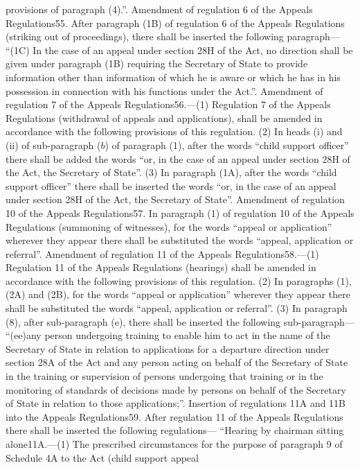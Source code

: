 \documentclass[a4paper]{article}
\begin{document}
provisions of paragraph (4).”.
Amendment of regulation 6 of the Appeals Regulations55. After paragraph (1B) of
regulation 6 of the Appeals Regulations (striking out of proceedings), there
shall be inserted the following paragraph—
“(1C) In the case of an appeal under section 28H of the Act, no direction shall
be given under paragraph (1B) requiring the Secretary of State to provide
information other than information of which he is aware or which he has in his
possession in connection with his functions under the Act.”.
Amendment of regulation 7 of the Appeals Regulations56.—(1) Regulation 7 of the
Appeals Regulations (withdrawal of appeals and applications), shall be amended
in accordance with the following provisions of this regulation.
(2) In heads (i) and (ii) of sub-paragraph ($b$) of paragraph (1), after the words
“child support officer” there shall be added the words “or, in the case of an
appeal under section 28H of the Act, the Secretary of State”.
(3) In paragraph (1A), after the words “child support officer” there shall be
inserted the words “or, in the case of an appeal under section 28H of the Act,
the Secretary of State”.
Amendment of regulation 10 of the Appeals Regulations57. In paragraph (1) of
regulation 10 of the Appeals Regulations (summoning of witnesses), for the words
“appeal or application” wherever they appear there shall be substituted the
words “appeal, application or referral”.
Amendment of regulation 11 of the Appeals Regulations58.—(1) Regulation 11 of
the Appeals Regulations (hearings) shall be amended in accordance with the
following provisions of this regulation.
(2) In paragraphs (1), (2A) and (2B), for the words “appeal or application”
wherever they appear there shall be substituted the words “appeal, application
or referral”.
(3) In paragraph (8), after sub-paragraph (e), there shall be inserted the
following sub-paragraph—
“(ee)any person undergoing training to enable him to act in the name of the
Secretary of State in relation to applications for a departure direction under
section 28A of the Act and any person acting on behalf of the Secretary of State
in the training or supervision of persons undergoing that training or in the
monitoring of standards of decisions made by persons on behalf of the Secretary
of State in relation to those applications;”.
Insertion of regulations 11A and 11B into the Appeals Regulations59. After
regulation 11 of the Appeals Regulations there shall be inserted the following
regulations—
“Hearing by chairman sitting alone11A.—(1) The prescribed circumstances for the
purpose of paragraph 9 of Schedule 4A to the Act (child support appeal
\end{document}

